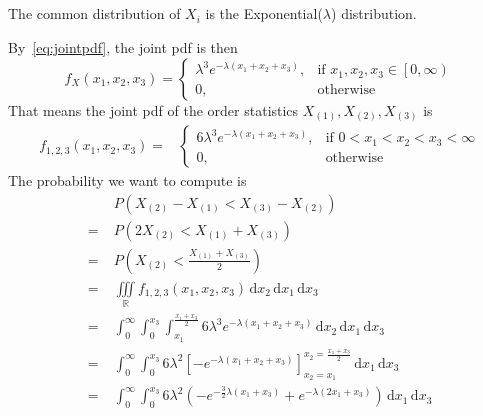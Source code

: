 \documentclass[hwnumber=3,studentnumber=20053722]{mthe353answer}
\begin{document}
\begin{questions}
\begin{parts}
      \part{}
      The common distribution of \(X_i\) is the Exponential(\(\lambda\))
      distribution.
      \begin{solution}
        By~\eqref{eq:jointpdf}, the joint pdf is then
        \begin{equation*}
          f_X(x_1, x_2, x_3) =
          \begin{cases}
            \lambda^3 e^{-\lambda(x_1 + x_2 + x_3)}, & \text{if } x_1, x_2, x_3 \in \left[0, \infty\right)\\
            0, & \text{otherwise}
          \end{cases}
        \end{equation*}
        That means the joint pdf of the order statistics \(X_{(1)}, X_{(2)},
        X_{(3)}\) is
        \begin{align*}
          f_{1, 2, 3}(x_1, x_2, x_3) =&
          \begin{cases}
            6\lambda^3 e^{-\lambda(x_1 + x_2 + x_3)}, & \text{if } 0 < x_1 < x_2 < x_3 < \infty\\
            0, & \text{otherwise}
          \end{cases}
        \end{align*}
        The probability we want to compute is
        \begin{align*}
          &\; P(X_{(2)} - X_{(1)} < X_{(3)} - X_{(2)})\\
          =&\; P(2X_{(2)} < X_{(1)} + X_{(3)})\\
          =&\; P(X_{(2)} < \frac{X_{(1)} + X_{(3)}}{2})\\
          =&\; \iiint \limits_{\mathbb{R}} f_{1, 2, 3}(x_1, x_2, x_3)
            \, \textrm{d}x_2 \, \textrm{d}x_1 \, \textrm{d}x_3\\
          =&\; \int_0^\infty \int_0^{x_3} \int_{x_1}^{\frac{x_1 + x_3}{2}} 6\lambda^3 e^{-\lambda(x_1 + x_2 + x_3)}
            \, \textrm{d}x_2 \, \textrm{d}x_1 \, \textrm{d}x_3\\
          =&\; \int_0^\infty \int_0^{x_3} 6\lambda^2\left[-e^{-\lambda(x_1+x_2+x_3)}\right]_{x_2=x_1}^{x_2=\frac{x_1+x_3}{2}}
            \, \textrm{d}x_1 \, \textrm{d}x_3\\
          =&\; \int_0^\infty \int_0^{x_3} 6\lambda^2\left(-e^{-\frac{3}{2}\lambda(x_1+x_3)} + e^{-\lambda(2x_1+x_3)}\right)
            \, \textrm{d}x_1 \, \textrm{d}x_3\\

\end{align*}
\end{solution}
\end{parts}
\end{questions}
\end{document}

